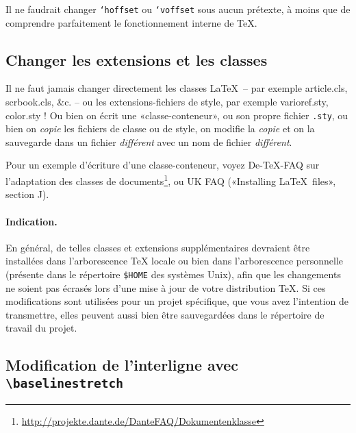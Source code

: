 \documentclass[fontsize=11pt, paper=a4, pagesize, captions=tableheading, numbers=enddot, toc=graduated, footnotes=multiple]{scrartcl}%
\DeclareRobustCommand*{\Macro}[1]{\mbox{\texttt{\char`\\#1}}}
\newcommand{\Doku}[1]{\textsf{#1}\xspace}
\newcommand{\Paket}[1]{\textsf{#1.sty}\xspace}
\newcommand{\Klasse}[1]{\textsf{#1.cls}\xspace}
\begin{document}
Il ne faudrait changer \Macro{hoffset} ou \Macro{voffset} sous aucun prétexte, à moins que de comprendre parfaitement le fonctionnement interne de \TeX.

\subsection{Changer les extensions et les classes}
\label{sec:ander-von-paket}

Il ne faut jamais changer directement les classes \LaTeX\ – par exemple \Klasse{article}, \Klasse{scrbook}, \&c. – ou les extensions-fichiers de style, par exemple \Paket{varioref}, \Paket{color} ! Ou bien on écrit une «classe-conteneur», ou son propre fichier \texttt{.sty}, ou bien on \emph{copie} les fichiers de classe ou de style, on modifie la \emph{copie} et on la sauvegarde dans un fichier \emph{différent} avec un nom de fichier \emph{différent}.

Pour un exemple d’écriture d’une classe-conteneur, voyez \Doku{De-TeX-FAQ} sur l’adaptation des classes de documents\footnote{\url{http://projekte.dante.de/DanteFAQ/Dokumentenklasse}}, ou \Doku{UK FAQ}\cite{ukfaq-13} («Installing \LaTeX\ files», section J).

\paragraph{Indication.}
\label{sec:hinweis}
En général, de telles classes et extensions supplémentaires devraient être installées dans l’arborescence \TeX{} locale ou bien dans l’arborescence personnelle (présente dans le répertoire \texttt{\$HOME} des systèmes Unix), afin que les changements ne soient pas écrasés lors d’une mise à jour de votre distribution \TeX. Si ces modifications sont utilisées pour un projet spécifique, que vous avez l’intention de transmettre, elles peuvent aussi bien être sauvegardées dans le répertoire de travail du projet.

\subsection{Modification de l'interligne avec \texttt{\textbackslash baselinestretch}}
\end{document}
